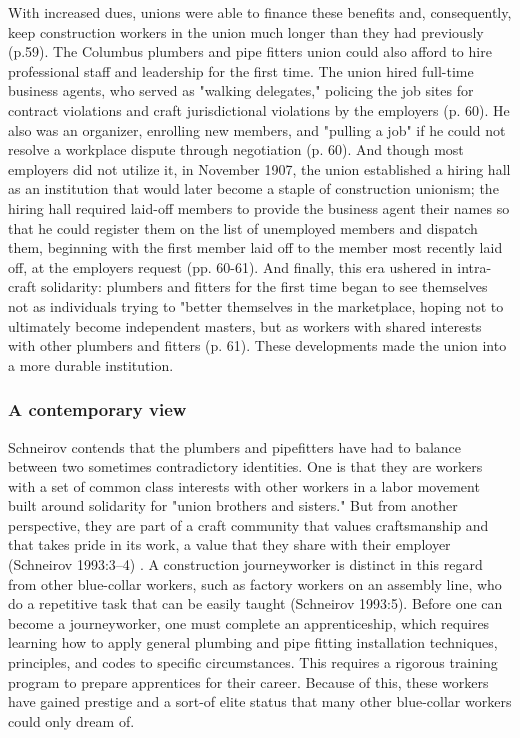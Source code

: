 \documentclass[12pt]{article}
\begin{document}
With increased dues, unions were able to finance these benefits and, consequently, keep construction workers in the union much longer than they had previously (p.59). The Columbus plumbers and pipe fitters union could also afford to hire professional staff and leadership for the first time. The union hired full-time business agents, who served as "walking delegates," policing the job sites for contract violations and craft jurisdictional violations by the employers (p. 60). He also was an organizer, enrolling new members, and "pulling a job" if he could not resolve a workplace dispute through negotiation (p. 60). And though most employers did not utilize it, in November 1907, the union established a hiring hall as an institution that would later become a staple of construction unionism; the hiring hall required laid-off members to provide the business agent their names so that he could register them on the list of unemployed members and dispatch them, beginning with the first member laid off to the member most recently laid off, at the employers request (pp. 60-61). And finally, this era ushered in intra-craft solidarity: plumbers and fitters for the first time began to see themselves not as individuals trying to "better themselves in the marketplace, hoping not to ultimately become independent masters, but as workers with shared interests with other plumbers and fitters (p. 61). These developments made the union into a more durable institution.

\subsubsection{A contemporary view}

Schneirov contends that the plumbers and pipefitters have had to balance between two sometimes contradictory identities. One is that they are workers with a set of common class interests with other workers in a labor movement built around solidarity for "union brothers and sisters." But from another perspective, they are part of a craft community that values craftsmanship and that takes pride in its work, a value that they share with their employer (Schneirov 1993:3–4) . A construction journeyworker is distinct in this regard from other blue-collar workers, such as factory workers on an assembly line, who do a repetitive task that can be easily taught (Schneirov 1993:5). Before one can become a journeyworker, one must complete an apprenticeship, which requires learning how to apply general plumbing and pipe fitting installation techniques, principles, and codes to specific circumstances. This requires a rigorous training program to prepare apprentices for their career. Because of this, these workers have gained prestige and a sort-of elite status that many other blue-collar workers could only dream of.
\end{document}
